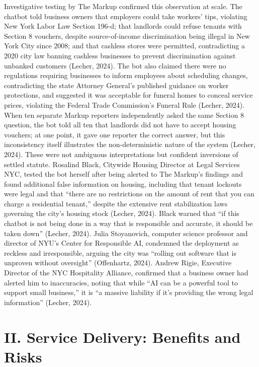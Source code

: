 \documentclass[10pt, twocolumn]{article}
\begin{document}
Investigative testing by The Markup confirmed this observation at scale. The chatbot told business owners that employers could take workers' tips, violating New York Labor Law Section 196-d; that landlords could refuse tenants with Section 8 vouchers, despite source-of-income discrimination being illegal in New York City since 2008; and that cashless stores were permitted, contradicting a 2020 city law banning cashless businesses to prevent discrimination against unbanked customers (Lecher, 2024). The bot also claimed there were no regulations requiring businesses to inform employees about scheduling changes, contradicting the state Attorney General's published guidance on worker protections, and suggested it was acceptable for funeral homes to conceal service prices, violating the Federal Trade Commission's Funeral Rule (Lecher, 2024). When ten separate Markup reporters independently asked the same Section 8 question, the bot told all ten that landlords did not have to accept housing vouchers; at one point, it gave one reporter the correct answer, but this inconsistency itself illustrates the non-deterministic nature of the system (Lecher, 2024). These were not ambiguous interpretations but confident inversions of settled statute. Rosalind Black, Citywide Housing Director at Legal Services NYC, tested the bot herself after being alerted to The Markup's findings and found additional false information on housing, including that tenant lockouts were legal and that ``there are no restrictions on the amount of rent that you can charge a residential tenant,'' despite the extensive rent stabilization laws governing the city's housing stock (Lecher, 2024). Black warned that ``if this chatbot is not being done in a way that is responsible and accurate, it should be taken down'' (Lecher, 2024). Julia Stoyanovich, computer science professor and director of NYU's Center for Responsible AI, condemned the deployment as reckless and irresponsible, arguing the city was ``rolling out software that is unproven without oversight'' (Offenhartz, 2024). Andrew Rigie, Executive Director of the NYC Hospitality Alliance, confirmed that a business owner had alerted him to inaccuracies, noting that while ``AI can be a powerful tool to support small business,'' it is ``a massive liability if it's providing the wrong legal information'' (Lecher, 2024).

\section*{II. Service Delivery: Benefits and Risks}
\end{document}
